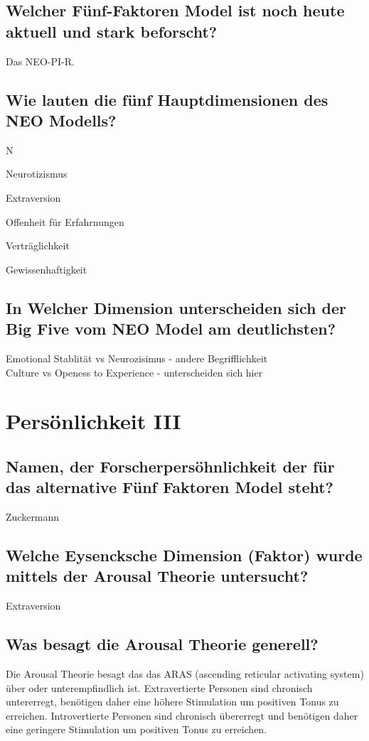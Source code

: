 \documentclass[a6paper,10pt,DIV=40]{scrartcl}
\begin{document}
\subsection{Welcher Fünf-Faktoren Model ist noch heute aktuell und stark beforscht?}
    Das NEO-PI-R.
\subsection{Wie lauten die fünf Hauptdimensionen des NEO Modells?}
    \begin{labeling}{N}
        \item [N] Neurotizismus
        \item [E] Extraversion
        \item [O] Offenheit für Erfahrnungen
        \item [A] Verträglichkeit
        \item [C] Gewissenhaftigkeit
    \end{labeling}

\subsection{In Welcher Dimension unterscheiden sich der Big Five vom NEO Model am deutlichsten?}
    Emotional Stablität vs Neurozisimus - andere Begrifflichkeit\\
    Culture vs Openess to Experience - unterscheiden sich hier

\section{Persönlichkeit III}
\subsection{Namen, der Forscherpersöhnlichkeit der für das alternative Fünf Faktoren Model steht?}
Zuckermann
\subsection{Welche Eysencksche Dimension (Faktor) wurde mittels der Arousal Theorie untersucht?}
Extraversion
\subsection{Was besagt die Arousal Theorie generell?}
Die Arousal Theorie besagt das das ARAS (ascending reticular activating system) über oder unterempfindlich ist. Extravertierte Personen sind chronisch untererregt, benötigen daher eine höhere Stimulation um positiven Tonus zu erreichen. Introvertierte Personen sind chronisch übererregt und benötigen daher eine geringere Stimulation um positiven Tonus zu erreichen.
\end{document}
